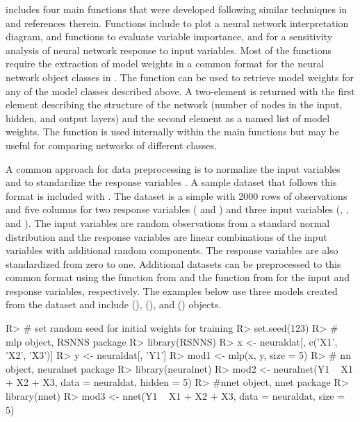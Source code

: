 \documentclass[article,shortnames]{jss}
\begin{document}
 includes four main functions that were developed following similar techniques in \citet{Olden02} and references therein.  Functions include  to plot a neural network interpretation diagram,  and  functions to evaluate variable importance, and  for a sensitivity analysis of neural network response to input variables.  Most of the functions require the extraction of model weights in a common format for the neural network object classes in .  The  function can be used to retrieve model weights for any of the model classes described above.  A two-element  is returned with the first element describing the structure of the network (number of nodes in the input, hidden, and output layers) and the second element as a named list of model weights.  The function is used internally within the main functions but may be useful for comparing networks of different classes.

A common approach for data preprocessing is to normalize the input variables and to standardize the response variables \citep{Lek00,Olden02}.  A sample dataset that follows this format is included with .  The  dataset is a simple  with 2000 rows of observations and five columns for two response variables ( and ) and three input variables (, , and ).  The input variables are random observations from a standard normal distribution and the response variables are linear combinations of the input variables with additional random components.  The response variables are also standardized from zero to one.  Additional datasets can be preprocessed to this common format using the  function from  and the  function from  for the input and response variables, respectively.  The examples below use three models created from the  dataset and include  (),  (), and  () objects.

\begin{Schunk}
\begin{Sinput}
R> # set random seed for initial weights for training
R> set.seed(123)
R> # mlp object, RSNNS package
R> library(RSNNS)
R> x <- neuraldat[, c('X1', 'X2', 'X3')]
R> y <- neuraldat[, 'Y1']
R> mod1 <- mlp(x, y, size = 5)
R> # nn object, neuralnet package
R> library(neuralnet)
R> mod2 <- neuralnet(Y1 ~ X1 + X2 + X3, data = neuraldat, hidden = 5)
R> #nnet object, nnet package
R> library(nnet)
R> mod3 <- nnet(Y1 ~ X1 + X2 + X3, data = neuraldat, size = 5)
\end{Sinput}
\end{Schunk}
\end{document}
